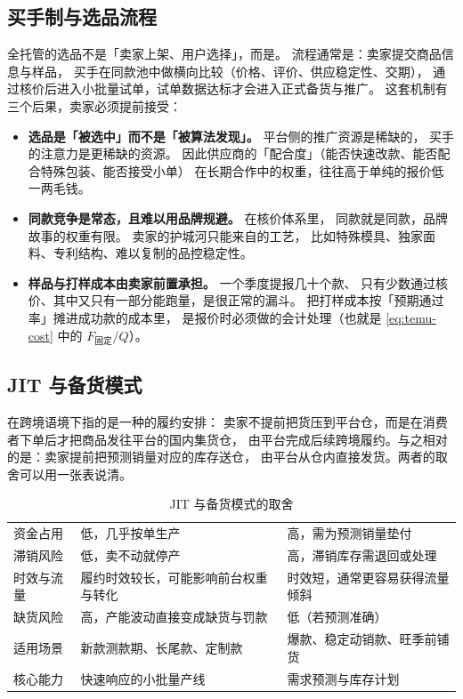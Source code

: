 \subsection{买手制与选品流程}

全托管的选品不是「卖家上架、用户选择」，而是。
流程通常是：卖家提交商品信息与样品，
买手在同款池中做横向比较（价格、评价、供应稳定性、交期），
通过核价后进入小批量试单，试单数据达标才会进入正式备货与推广。
这套机制有三个后果，卖家必须提前接受：

\begin{itemize}
  \item \textbf{选品是「被选中」而不是「被算法发现」。} 平台侧的推广资源是稀缺的，
        买手的注意力是更稀缺的资源。
        因此供应商的「配合度」（能否快速改款、能否配合特殊包装、能否接受小单）
        在长期合作中的权重，往往高于单纯的报价低一两毛钱。
  \item \textbf{同款竞争是常态，且难以用品牌规避。} 在核价体系里，
        同款就是同款，品牌故事的权重有限。
        卖家的护城河只能来自的工艺，
        比如特殊模具、独家面料、专利结构、难以复制的品控稳定性。
  \item \textbf{样品与打样成本由卖家前置承担。} 一个季度提报几十个款、
        只有少数通过核价、其中又只有一部分能跑量，是很正常的漏斗。
        把打样成本按「预期通过率」摊进成功款的成本里，
        是报价时必须做的会计处理（也就是 \cref{eq:temu-cost} 中的 $F_{\text{固定}}/Q$）。
\end{itemize}

\subsection{JIT 与备货模式}

 在跨境语境下指的是一种的履约安排：
卖家不提前把货压到平台仓，而是在消费者下单后才把商品发往平台的国内集货仓，
由平台完成后续跨境履约。与之相对的是：卖家提前把预测销量对应的库存送仓，
由平台从仓内直接发货。两者的取舍可以用一张表说清。

\begin{table}[htbp]
\centering
\caption{JIT 与备货模式的取舍}
\label{tab:temu-replenish}
\small
\begin{tabularx}{\textwidth}{L{2.5cm} Y Y}
\toprule
{} &  &  \\
\midrule
资金占用 & 低，几乎按单生产 & 高，需为预测销量垫付 \\
\addlinespace
滞销风险 & 低，卖不动就停产 & 高，滞销库存需退回或处理 \\
\addlinespace
时效与流量 & 履约时效较长，可能影响前台权重与转化 & 时效短，通常更容易获得流量倾斜 \\
\addlinespace
缺货风险 & 高，产能波动直接变成缺货与罚款 & 低（若预测准确） \\
\addlinespace
适用场景 & 新款测款期、长尾款、定制款 & 爆款、稳定动销款、旺季前铺货 \\
\addlinespace
核心能力 & 快速响应的小批量产线 & 需求预测与库存计划 \\
\bottomrule
\end{tabularx}
\end{table}

